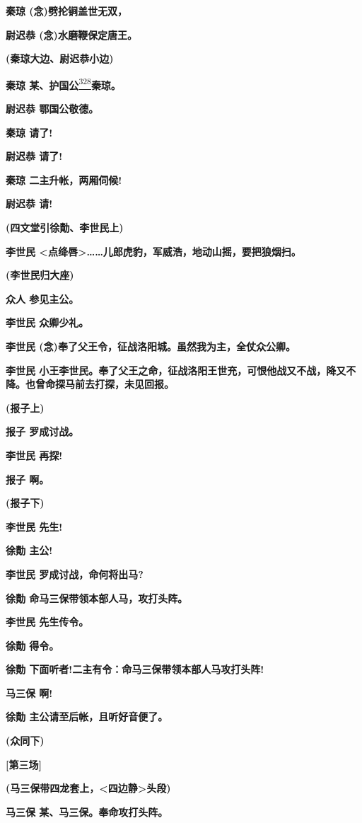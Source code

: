 \textbf{秦琼 (念)劈抡锏盖世无双，}

\textbf{尉迟恭 (念)水磨鞭保定唐王。}

\textbf{(秦琼大边、尉迟恭小边)}

\textbf{秦琼
某、护国公}\protect\hyperlink{fn328}{\textsuperscript{328}}\textbf{秦琼。}

\textbf{尉迟恭 鄂国公敬德。}

\textbf{秦琼 请了!}

\textbf{尉迟恭 请了!}

\textbf{秦琼 二主升帐，两厢伺候!}

\textbf{尉迟恭 请!}

\textbf{(四文堂引徐勣、李世民上)}

\textbf{李世民
\textless{}点绛唇\textgreater{}\ldots{}\ldots{}儿郎虎豹，军威浩，地动山摇，要把狼烟扫。}

\textbf{(李世民归大座)}

\textbf{众人 参见主公。}

\textbf{李世民 众卿少礼。}

\textbf{李世民 (念)奉了父王令，征战洛阳城。虽然我为主，全仗众公卿。}

\textbf{李世民
小王李世民。奉了父王之命，征战洛阳王世充，可恨他战又不战，降又不降。也曾命探马前去打探，未见回报。}

\textbf{(报子上)}

\textbf{报子 罗成讨战。}

\textbf{李世民 再探!}

\textbf{报子 啊。}

\textbf{(报子下)}

\textbf{李世民 先生!}

\textbf{徐勣 主公!}

\textbf{李世民 罗成讨战，命何将出马?}

\textbf{徐勣 命马三保带领本部人马，攻打头阵。}

\textbf{李世民 先生传令。}

\textbf{徐勣 得令。}

\textbf{徐勣 下面听者!二主有令：命马三保带领本部人马攻打头阵!}

\textbf{马三保 啊!}

\textbf{徐勣 主公请至后帐，且听好音便了。}

\textbf{(众同下)}

\textbf{{[}第三场{]}}

\textbf{(马三保带四龙套上，\textless{}四边静\textgreater{}头段)}

\textbf{马三保 某、马三保。奉命攻打头阵。}

